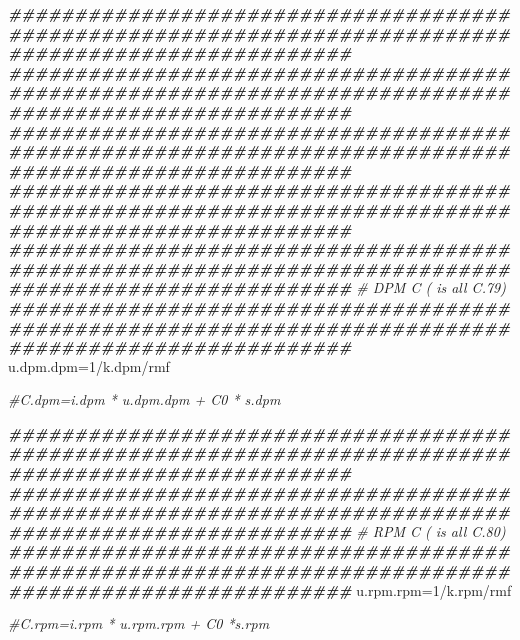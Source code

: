 \documentclass[
  10pt,
  b5paper,
]{book}
\newenvironment{Shaded}{\begin{snugshade}}{\end{snugshade}}
\newcommand{\CommentTok}[1]{\textcolor[rgb]{0.56,0.35,0.01}{\textit{#1}}}
\newcommand{\DecValTok}[1]{\textcolor[rgb]{0.00,0.00,0.81}{#1}}
\newcommand{\DocumentationTok}[1]{\textcolor[rgb]{0.56,0.35,0.01}{\textbf{\textit{#1}}}}
\newcommand{\NormalTok}[1]{#1}
\newcommand{\OtherTok}[1]{\textcolor[rgb]{0.56,0.35,0.01}{#1}}
\newcommand{\SpecialCharTok}[1]{\textcolor[rgb]{0.00,0.00,0.00}{#1}}
\begin{document}
\begin{Shaded}
\begin{Highlighting}[]
  \DocumentationTok{\#\#\#\#\#\#\#\#\#\#\#\#\#\#\#\#\#\#\#\#\#\#\#\#\#\#\#\#\#\#\#\#\#\#\#\#\#\#\#\#\#\#\#\#\#\#\#\#\#\#\#\#\#\#\#\#\#\#\#\#\#\#\#\#\#\#\#\#\#\#\#\#\#\#\#\#\#\#\#\#\#\#\#\#\#\#\#\#\#\#\#\#\#\#\#\#\#\#\#\#\#\#}
  \DocumentationTok{\#\#\#\#\#\#\#\#\#\#\#\#\#\#\#\#\#\#\#\#\#\#\#\#\#\#\#\#\#\#\#\#\#\#\#\#\#\#\#\#\#\#\#\#\#\#\#\#\#\#\#\#\#\#\#\#\#\#\#\#\#\#\#\#\#\#\#\#\#\#\#\#\#\#\#\#\#\#\#\#\#\#\#\#\#\#\#\#\#\#\#\#\#\#\#\#\#\#\#\#\#\#}
  \DocumentationTok{\#\#\#\#\#\#\#\#\#\#\#\#\#\#\#\#\#\#\#\#\#\#\#\#\#\#\#\#\#\#\#\#\#\#\#\#\#\#\#\#\#\#\#\#\#\#\#\#\#\#\#\#\#\#\#\#\#\#\#\#\#\#\#\#\#\#\#\#\#\#\#\#\#\#\#\#\#\#\#\#\#\#\#\#\#\#\#\#\#\#\#\#\#\#\#\#\#\#\#\#\#\#}
  \DocumentationTok{\#\#\#\#\#\#\#\#\#\#\#\#\#\#\#\#\#\#\#\#\#\#\#\#\#\#\#\#\#\#\#\#\#\#\#\#\#\#\#\#\#\#\#\#\#\#\#\#\#\#\#\#\#\#\#\#\#\#\#\#\#\#\#\#\#\#\#\#\#\#\#\#\#\#\#\#\#\#\#\#\#\#\#\#\#\#\#\#\#\#\#\#\#\#\#\#\#\#\#\#\#\#}
  \DocumentationTok{\#\#\#\#\#\#\#\#\#\#\#\#\#\#\#\#\#\#\#\#\#\#\#\#\#\#\#\#\#\#\#\#\#\#\#\#\#\#\#\#\#\#\#\#\#\#\#\#\#\#\#\#\#\#\#\#\#\#\#\#\#\#\#\#\#\#\#\#\#\#\#\#\#\#\#\#\#\#\#\#\#\#\#\#\#\#\#\#\#\#\#\#\#\#\#\#\#\#\#\#\#\#}
  \CommentTok{\# DPM C ( is all C.79)}
  \DocumentationTok{\#\#\#\#\#\#\#\#\#\#\#\#\#\#\#\#\#\#\#\#\#\#\#\#\#\#\#\#\#\#\#\#\#\#\#\#\#\#\#\#\#\#\#\#\#\#\#\#\#\#\#\#\#\#\#\#\#\#\#\#\#\#\#\#\#\#\#\#\#\#\#\#\#\#\#\#\#\#\#\#\#\#\#\#\#\#\#\#\#\#\#\#\#\#\#\#\#\#\#\#\#\#}
\NormalTok{  u.dpm.dpm}\OtherTok{=}\DecValTok{1}\SpecialCharTok{/}\NormalTok{k.dpm}\SpecialCharTok{/}\NormalTok{rmf }
  
  \CommentTok{\#C.dpm=i.dpm * u.dpm.dpm + C0 * s.dpm}
  
  \DocumentationTok{\#\#\#\#\#\#\#\#\#\#\#\#\#\#\#\#\#\#\#\#\#\#\#\#\#\#\#\#\#\#\#\#\#\#\#\#\#\#\#\#\#\#\#\#\#\#\#\#\#\#\#\#\#\#\#\#\#\#\#\#\#\#\#\#\#\#\#\#\#\#\#\#\#\#\#\#\#\#\#\#\#\#\#\#\#\#\#\#\#\#\#\#\#\#\#\#\#\#\#\#\#\#}
  \DocumentationTok{\#\#\#\#\#\#\#\#\#\#\#\#\#\#\#\#\#\#\#\#\#\#\#\#\#\#\#\#\#\#\#\#\#\#\#\#\#\#\#\#\#\#\#\#\#\#\#\#\#\#\#\#\#\#\#\#\#\#\#\#\#\#\#\#\#\#\#\#\#\#\#\#\#\#\#\#\#\#\#\#\#\#\#\#\#\#\#\#\#\#\#\#\#\#\#\#\#\#\#\#\#\#}
  \CommentTok{\# RPM C ( is all C.80)}
  \DocumentationTok{\#\#\#\#\#\#\#\#\#\#\#\#\#\#\#\#\#\#\#\#\#\#\#\#\#\#\#\#\#\#\#\#\#\#\#\#\#\#\#\#\#\#\#\#\#\#\#\#\#\#\#\#\#\#\#\#\#\#\#\#\#\#\#\#\#\#\#\#\#\#\#\#\#\#\#\#\#\#\#\#\#\#\#\#\#\#\#\#\#\#\#\#\#\#\#\#\#\#\#\#\#\#}
\NormalTok{  u.rpm.rpm}\OtherTok{=}\DecValTok{1}\SpecialCharTok{/}\NormalTok{k.rpm}\SpecialCharTok{/}\NormalTok{rmf}
  
  \CommentTok{\#C.rpm=i.rpm * u.rpm.rpm + C0 *s.rpm}
  

\end{Highlighting}
\end{Shaded}
\end{document}
